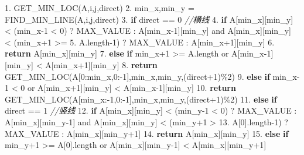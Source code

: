 \documentclass[
]{ctexart}
\newenvironment{Shaded}{}{}
\newcommand{\CommentTok}[1]{\textcolor[rgb]{0.38,0.63,0.69}{\textit{#1}}}
\newcommand{\ControlFlowTok}[1]{\textcolor[rgb]{0.00,0.44,0.13}{\textbf{#1}}}
\newcommand{\DecValTok}[1]{\textcolor[rgb]{0.25,0.63,0.44}{#1}}
\newcommand{\FloatTok}[1]{\textcolor[rgb]{0.25,0.63,0.44}{#1}}
\newcommand{\NormalTok}[1]{#1}
\begin{document}
\begin{Shaded}
\begin{Highlighting}[]
\FloatTok{1.}\NormalTok{ GET\_MIN\_LOC(A,i,j,direct)}
\FloatTok{2.}\NormalTok{ 	min\_x,min\_y = FIND\_MIN\_LINE(A,i,j,direct)}
\FloatTok{3.} 	\ControlFlowTok{if}\NormalTok{ direct == }\DecValTok{0} \CommentTok{//横线}
\FloatTok{4.}		\ControlFlowTok{if}\NormalTok{ A[min\_x][min\_y] \textless{} (min\_x{-}}\DecValTok{1}\NormalTok{ \textless{} }\DecValTok{0}\NormalTok{) ? MAX\_VALUE : A[min\_x{-}}\DecValTok{1}\NormalTok{][min\_y] and A[min\_x][min\_y] \textless{} (min\_x+}\DecValTok{1}\NormalTok{ \textgreater{}= 	                       }\FloatTok{5.}\NormalTok{			  A.length{-}}\DecValTok{1}\NormalTok{) ? MAX\_VALUE : A[min\_x+}\DecValTok{1}\NormalTok{][min\_y]}
\FloatTok{6.} 			\ControlFlowTok{return}\NormalTok{ A[min\_x][min\_y]}
\FloatTok{7.} 		\ControlFlowTok{else} \ControlFlowTok{if}\NormalTok{ min\_x+}\DecValTok{1}\NormalTok{ \textgreater{}= A.length or A[min\_x{-}}\DecValTok{1}\NormalTok{][min\_y] \textless{} A[min\_x+}\DecValTok{1}\NormalTok{][min\_y]}
\FloatTok{8.} 			\ControlFlowTok{return}\NormalTok{ GET\_MIN\_LOC(A[}\DecValTok{0}\NormalTok{:min\_x,}\DecValTok{0}\NormalTok{:{-}}\DecValTok{1}\NormalTok{],min\_x,min\_y,(direct+}\DecValTok{1}\NormalTok{)\%}\DecValTok{2}\NormalTok{)}
\FloatTok{9.} 		\ControlFlowTok{else} \ControlFlowTok{if}\NormalTok{ min\_x{-}}\DecValTok{1}\NormalTok{ \textless{} }\DecValTok{0}\NormalTok{ or A[min\_x+}\DecValTok{1}\NormalTok{][min\_y] \textless{} A[min\_x{-}}\DecValTok{1}\NormalTok{][min\_y]}
\FloatTok{10.}			\ControlFlowTok{return}\NormalTok{ GET\_MIN\_LOC(A[min\_x:{-}}\DecValTok{1}\NormalTok{,}\DecValTok{0}\NormalTok{:{-}}\DecValTok{1}\NormalTok{],min\_x,min\_y,(direct+}\DecValTok{1}\NormalTok{)\%}\DecValTok{2}\NormalTok{)}
\FloatTok{11.}	\ControlFlowTok{else} \ControlFlowTok{if}\NormalTok{ direct == }\DecValTok{1} \CommentTok{//竖线}
\FloatTok{12.}		\ControlFlowTok{if}\NormalTok{ A[min\_x][min\_y] \textless{} (min\_y{-}}\DecValTok{1}\NormalTok{ \textless{} }\DecValTok{0}\NormalTok{) ? MAX\_VALUE : A[min\_x][min\_y{-}}\DecValTok{1}\NormalTok{] and A[min\_x][min\_y] \textless{} (min\_y+}\DecValTok{1}\NormalTok{ \textgreater{}       }\FloatTok{13.}\NormalTok{				 A[}\DecValTok{0}\NormalTok{].length{-}}\DecValTok{1}\NormalTok{) ? MAX\_VALUE : A[min\_x][min\_y+}\DecValTok{1}\NormalTok{]}
\FloatTok{14.}			\ControlFlowTok{return}\NormalTok{ A[min\_x][min\_y]}
\FloatTok{15.}		\ControlFlowTok{else} \ControlFlowTok{if}\NormalTok{ min\_y+}\DecValTok{1}\NormalTok{ \textgreater{}= A[}\DecValTok{0}\NormalTok{].length or A[min\_x][min\_y{-}}\DecValTok{1}\NormalTok{] \textless{} A[min\_x][min\_y+}\DecValTok{1}\NormalTok{]}

\end{Highlighting}
\end{Shaded}
\end{document}
